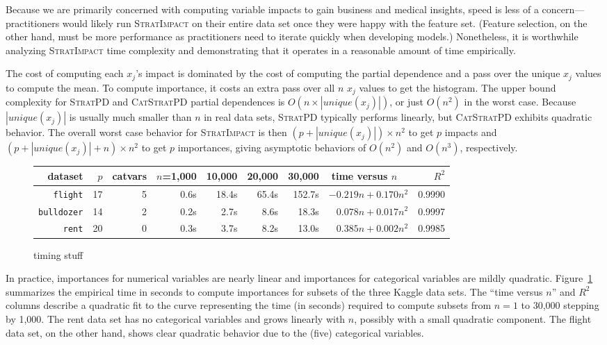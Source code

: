 \documentclass[11pt]{article}
\newcommand{\figref}[1]{Figure~\ref{#1}}
\newcommand{\simp}{\fontfamily{cmr}\textsc{\small StratImpact}}
\newcommand{\spd}{\fontfamily{cmr}\textsc{\small StratPD}}
\newcommand{\cspd}{\fontfamily{cmr}\textsc{\small CatStratPD}}
\begin{document}
Because we are primarily concerned with computing variable impacts to gain business and medical insights, speed is less of a concern---practitioners would likely run \simp{} on their entire data set once they were happy with the feature set. (Feature selection, on the other hand, must be more performance as practitioners need to iterate quickly when developing models.)   Nonetheless, it is worthwhile analyzing \simp{} time complexity and demonstrating that it operates in a reasonable amount of time empirically.

The cost of computing each $x_j$'s impact is dominated by the cost of computing the partial dependence and a pass over the unique $x_j$ values to compute the mean. To compute importance, it costs an extra pass over all $n$ $x_j$ values to get the histogram. The upper bound  complexity for \spd{} and \cspd{} partial dependences is $O(n \times |unique(x_j)|)$, or just $O(n^2)$ in the worst case.   Because $|unique(x_j)|$ is usually much smaller than $n$ in real data sets, \spd{} typically performs linearly, but \cspd{} exhibits quadratic behavior.  The overall worst case behavior for \simp{} is then $(p + |unique(x_j)|)\times n^2$ to get $p$ impacts and $(p + |unique(x_j)|+n)\times n^2$  to get $p$ importances, giving asymptotic behaviors of $O(n^2)$ and $O(n^3)$, respectively. 

\begin{figure}
\centering
\begin{tabular}{r r r r r r r r r}
{\bf dataset} & $p$ & catvars & {\small $n$=1,000} & {\small 10,000} & {\small 20,000} & {\small 30,000} & time versus $n$~~ & $R^2$\\
\hline
{\tt\small flight} & 17 & 5 & 0.6s & 18.4s & 65.4s & 152.7s & {\small $-0.219 n + 0.170 n^2$} & {\small 0.9990}\\
{\tt\small bulldozer} & 14 & 2 & 0.2s & 2.7s & 8.6s & 18.3s & {\small $0.078 n + 0.017 n^2$} & {\small 0.9997}\\
{\tt\small rent} & 20 & 0 & 0.3s & 3.7s & 8.2s & 13.0s & {\small $0.385 n + 0.002 n^2$} & {\small 0.9985}\\
\end{tabular}
\caption{timing stuff}
\label{fig:timing}
\end{figure}

In practice, importances for numerical variables are nearly linear and importances for categorical variables are mildly quadratic. \figref{fig:timing} summarizes the empirical time in seconds to compute importances for subsets of the three Kaggle data sets. The ``time versus $n$'' and $R^2$ columns describe a quadratic fit to the curve representing the time (in seconds) required to compute subsets from $n=1$ to 30,000 stepping by 1,000. The rent data set has no categorical variables and grows linearly with $n$, possibly with a small quadratic component. The flight data set, on the other hand, shows clear quadratic behavior due to the (five) categorical variables.
\end{document}
